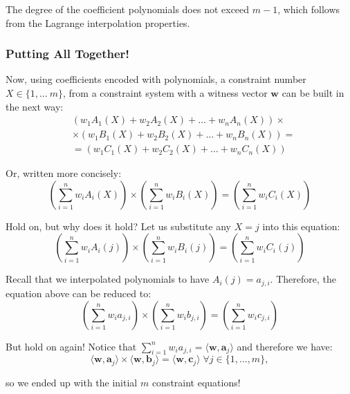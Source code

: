\documentclass[../lecture-notes.tex]{subfiles}
\begin{document}
\begin{remark}
    The degree of the coefficient polynomials does not exceed $m - 1$, which follows from the Lagrange interpolation properties.
\end{remark}

\subsubsection{Putting All Together!}

Now, using coefficients encoded with polynomials, a constraint number $X \in \{1, \dots\ m\}$, from
a constraint system with a witness vector $\mathbf{w}$ can be built in the next way:
\begin{align*}
    &(w_1A_1(X) + w_2A_2(X) + \dots + w_nA_n(X)) \times \\ &\times (w_1B_1(X) + w_2B_2(X) + \dots + w_nB_n(X)) = \\ &= (w_1C_1(X) + w_2C_2(X) + \dots + w_nC_n(X))
\end{align*}

Or, written more concisely:
\begin{equation*}
    \left( \sum_{i = 1}^{n} w_iA_i(X) \right) \times \left( \sum_{i = 1}^{n} w_iB_i(X) \right) = \left( \sum_{i = 1}^{n} w_iC_i(X) \right)
\end{equation*}

\begin{remark}
    Hold on, but why does it hold? Let us substitute any $X=j$ into this equation:
    \begin{equation*}
        \left( \sum_{i = 1}^{n} w_iA_i(j) \right) \times \left( \sum_{i = 1}^{n} w_iB_i(j) \right) = \left( \sum_{i = 1}^{n} w_iC_i(j) \right)
    \end{equation*}

    Recall that we interpolated polynomials to have $A_i(j) = a_{j,i}$. Therefore, the equation above can be reduced to:
    \begin{equation*}
        \left( \sum_{i = 1}^{n} w_ia_{j,i} \right) \times \left( \sum_{i = 1}^{n} w_ib_{j,i} \right) = \left( \sum_{i = 1}^{n} w_ic_{j,i} \right)
    \end{equation*}

    But hold on again! Notice that $\sum_{i = 1}^{n} w_ia_{j,i} = \langle \mathbf{w}, \mathbf{a}_j \rangle$ and therefore we have:
    \begin{equation*}
        \langle \mathbf{w}, \mathbf{a}_j \rangle \times \langle \mathbf{w}, \mathbf{b}_j \rangle = \langle \mathbf{w}, \mathbf{c}_j \rangle \; \forall j \in \{1,\dots,m\},
    \end{equation*}
    
    so we ended up with the initial $m$ constraint equations!
\end{remark}
\end{document}
